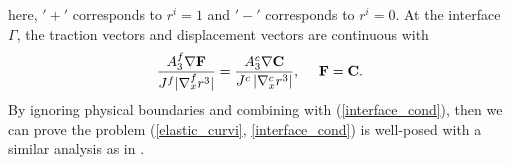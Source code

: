 here, $'+'$ corresponds to $r^{i} = 1$ and $'-'$ corresponds to $r^{i} = 0$.  At the interface $\Gamma$, the traction vectors and displacement vectors are continuous with
\begin{equation}\label{interface_cond}
\frac{A_3^f\nabla{\bf F}}{J^f|\nabla_x^f r^{3}|}  = \frac{A_3^c\nabla{\bf C}}{J^c\left|\nabla_x^c r^{3}\right|}, \ \ \ \ {\bf F} = {\bf C}.
\end{equation}
By ignoring physical boundaries and combining with (\ref{interface_cond}), then we can prove the problem (\ref{elastic_curvi}, \ref{interface_cond}) is well-posed with a similar analysis as in \cite{duru2014stable, petersson2015wave}.


